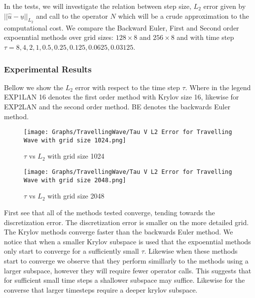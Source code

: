In the tests, we will investigate the relation between step size, $L_2$ error given by $||\hat u - \underline{u}||_{L_2}$ and call to the operator $N$ which will be a crude approximation to the computational cost.
We compare the Backward Euler, First and Second order expoenntial methods over grid sizes: $128 \times 8$ and $256 \times 8$ and with time step $\tau=8,4,2,1,0.5,0.25,0.125,0.0625,0.03125$.

\subsubsection{Experimental Results}

Bellow we show the $L_2$ error with respect to the time step $\tau$.
Where in the legend EXP1LAN 16 denotes the first order method with Krylov size 16, likewise for EXP2LAN and the second order method.
BE denotes the backwards Euler method.

\begin{figure}[H]
    \centering
    \begin{minipage}{0.49\textwidth}
        \texttt{[image: Graphs/TravellingWave/Tau V L2 Error for Travelling Wave with grid size 1024.png]} %
        \caption{$\tau$ vs $L_2$ with grid size 1024}
        \label{fig:plot1}
    \end{minipage}\hfill
    \centering
    \begin{minipage}{0.49\textwidth}
        \texttt{[image: Graphs/TravellingWave/Tau V L2 Error for Travelling Wave with grid size 2048.png]} %
        \caption{$\tau$ vs $L_2$ with grid size 2048}
        \label{fig:plot2}
    \end{minipage}\hfill
\end{figure}

First see that all of the methods tested converge, tending towards the discretization error.
The discretization error is smaller on the more detailed grid.
The Krylov methods converge faster than the backwards Euler method.
We notice that when a smaller Krylov subspace is used that the expoenntial methods only start to converge for a sufficiently small $\tau$.
Likewise when these methods start to converge we observe that they perform simillarly to the methods using a larger subspace, however they will require fewer operator calls.
This suggests that for sufficient small time steps a shallower subspace may suffice.
Likewise for the converse that larger timesteps require a deeper krylov subspace.

